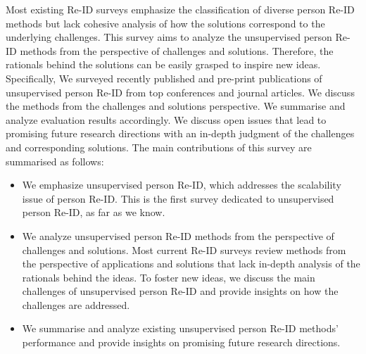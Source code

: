 \documentclass[a4paper,fleqn]{cas-dc}
\begin{document}
Most existing Re-ID surveys emphasize the classification of diverse person Re-ID methods but lack cohesive analysis of how the solutions correspond to the underlying challenges. This survey aims to analyze the unsupervised person Re-ID methods from the perspective of challenges and solutions. Therefore, the rationals behind the solutions can be easily grasped to inspire new ideas. Specifically, We surveyed recently published and pre-print publications of unsupervised person Re-ID from top conferences and journal articles. We discuss the methods from the challenges and solutions perspective. We summarise and analyze evaluation results accordingly. We discuss open issues that lead to promising future research directions with an in-depth judgment of the challenges and corresponding solutions. The main contributions of this survey are summarised as follows:
\begin{itemize}
\item We emphasize unsupervised person Re-ID, which addresses the scalability issue of person Re-ID. This is the first survey dedicated to unsupervised person Re-ID, as far as we know.  
\item We analyze unsupervised person Re-ID methods from the perspective of challenges and solutions. Most current Re-ID surveys review methods from the perspective of applications and solutions that lack in-depth analysis of the rationals behind the ideas. To foster new ideas, we discuss the main challenges of unsupervised person Re-ID and provide insights on how the challenges are addressed.
\item We summarise and analyze existing unsupervised person Re-ID methods' performance and provide insights on promising future research directions.
\end{itemize}
\end{document}
